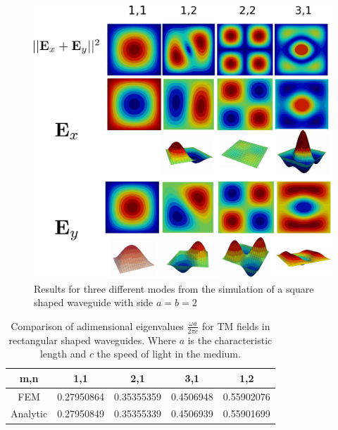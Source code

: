 \begin{figure}
\centering
\includegraphics[scale=0.1]{./img/square_waveguide.pdf}
\caption{Results for three different modes from the simulation of a square shaped waveguide with side $a=b=2$}
\label{fig:square_waveguide}
\end{figure}

\begin{table}
\begin{center}
\begin{tabular}{|c|c|c|c|c|}
\hline 
m,n & 1,1 & 2,1 & 3,1 & 1,2 \\ 
\hline 
FEM      & 0.27950864 & 0.35355359 & 0.4506948 &  0.55902076 \\
\hline 
Analytic & 0.27950849 & 0.35355339 & 0.4506939 &  0.55901699 \\
\hline 
\end{tabular} 
\caption{Comparison of adimensional eigenvalues $\frac{\omega a}{2\pi c}$ for TM fields in  rectangular shaped waveguides. Where $a$ is the characteristic length and $c$ the speed of light in the medium.}
\label{tab:rec_wav_comparison}
\end{center}
\end{table}

